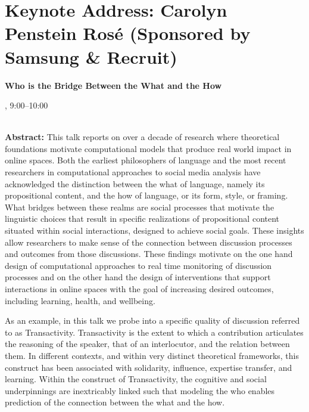 \section{Keynote Address: Carolyn Penstein Rosé (Sponsored by Samsung \& Recruit)}

\begin{center}
\begin{Large}
{\bfseries\Large Who is the Bridge Between the What and the How}
\vspace{1em}\par
\end{Large}

\daydateyear, 9:00--10:00 \vspace{1em}\\
\PlenaryLoc \\
\vspace{1em}\par
\end{center}

\noindent

{\bf Abstract:} This talk reports on over a decade of research where theoretical foundations motivate computational models that produce real world impact in online spaces. Both the earliest philosophers of language and the most recent researchers in computational approaches to social media analysis have acknowledged the distinction between the what of language, namely its propositional content, and the how of language, or its form, style, or framing. What bridges between these realms are social processes that motivate the linguistic choices that result in specific realizations of propositional content situated within social interactions, designed to achieve social goals. These insights allow researchers to make sense of the connection between discussion processes and outcomes from those discussions. These findings motivate on the one hand design of computational approaches to real time monitoring of discussion processes and on the other hand the design of interventions that support interactions in online spaces with the goal of increasing desired outcomes, including learning, health, and wellbeing.

As an example, in this talk we probe into a specific quality of discussion referred to as Transactivity. Transactivity is the extent to which a contribution articulates the reasoning of the speaker, that of an interlocutor, and the relation between them. In different contexts, and within very distinct theoretical frameworks, this construct has been associated with solidarity, influence, expertise transfer, and learning. Within the construct of Transactivity, the cognitive and social underpinnings are inextricably linked such that modeling the who enables prediction of the connection between the what and the how.

